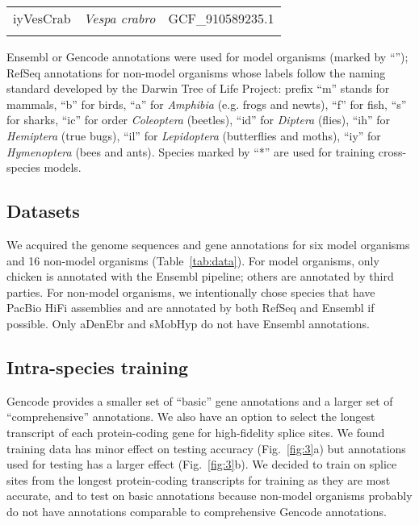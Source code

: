 \documentclass[webpdf,contemporary,large,namedate]{oup-authoring-template}%
\begin{document}
\begin{table}[!tb]
\begin{tabular*}{\columnwidth}{@{\extracolsep\fill}lll@{\extracolsep\fill}}
iyVesCrab      & \emph{Vespa crabro}               & GCF\_910589235.1 \\
\botrule
\end{tabular*}
\begin{tablenotes}\setlength\itemsep{0.0em}
Ensembl or Gencode annotations were used for model organisms (marked by ``\dag'');
RefSeq annotations for non-model organisms whose labels
follow the naming standard developed by the Darwin Tree of Life Project:
prefix ``m'' stands for mammals,
``b'' for birds,
``a'' for \emph{Amphibia} (e.g. frogs and newts),
``f'' for fish,
``s'' for sharks,
``ic'' for order \emph{Coleoptera} (beetles),
``id'' for \emph{Diptera} (flies),
``ih'' for \emph{Hemiptera} (true bugs),
``il'' for \emph{Lepidoptera} (butterflies and moths),
``iy'' for \emph{Hymenoptera} (bees and ants).
Species marked by ``*'' are used for training cross-species models.
\end{tablenotes}
\end{table}

\subsection{Datasets}

We acquired the genome sequences and gene annotations for six model organisms and 16 non-model organisms (Table~\ref{tab:data}).
For model organisms, only chicken is annotated with the Ensembl pipeline;
others are annotated by third parties.
For non-model organisms, we intentionally chose species that have PacBio HiFi assemblies
and are annotated by both RefSeq and Ensembl if possible.
Only aDenEbr and sMobHyp do not have Ensembl annotations.

\subsection{Intra-species training}

Gencode provides a smaller set of ``basic'' gene annotations and a larger set of ``comprehensive'' annotations.
We also have an option to select the longest transcript of each protein-coding gene for high-fidelity splice sites.
We found training data has minor effect on testing accuracy (Fig.~\ref{fig:3}a)
but annotations used for testing has a larger effect (Fig.~\ref{fig:3}b).
We decided to train on splice sites from the longest protein-coding transcripts for training as they are most accurate,
and to test on basic annotations because non-model organisms probably do not have annotations comparable to comprehensive Gencode annotations.
\end{document}
